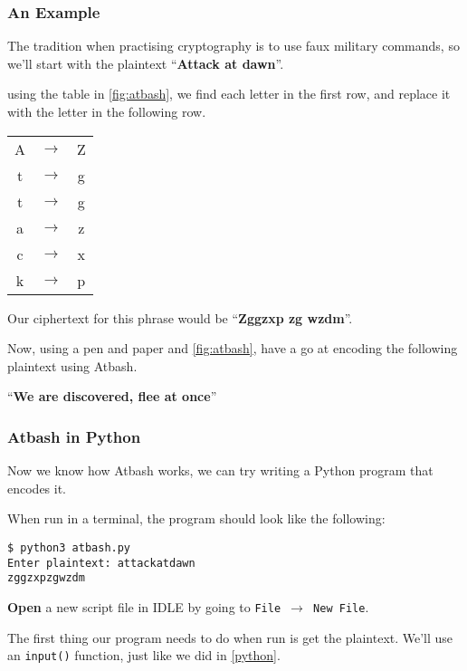 	\subsubsection*{An Example}
	
		The tradition when practising cryptography is to use faux military commands, so we'll start with the plaintext ``\textbf{Attack at dawn}''.
		
		using the table in \autoref{fig:atbash}, we find each letter in the first row, and replace it with the letter in the following row.
		
		\begin{tabular}{ccc}
			A & $\rightarrow$ & Z \\ 
			t & $\rightarrow$ & g \\ 
			t & $\rightarrow$ & g \\ 
			a & $\rightarrow$ & z \\ 
			c & $\rightarrow$ & x \\ 
			k & $\rightarrow$ & p \\ 
		\end{tabular} 
	
		Our ciphertext for this phrase would be ``\textbf{Zggzxp zg wzdm}''.
	
		Now, using a pen and paper and \autoref{fig:atbash}, have a go at encoding the following plaintext using Atbash.
		
		``\textbf{We are discovered, flee at once}''
	
	\subsubsection*{Atbash in Python}
	
		Now we know how Atbash works, we can try writing a Python program that encodes it.
		
		When run in a terminal, the program should look like the following:
		
		\begin{lstlisting}[style=Terminal, numbers=none]
$ python3 atbash.py
Enter plaintext: attackatdawn
zggzxpzgwzdm
		\end{lstlisting}
		
		\textbf{Open} a new script file in IDLE by going to \texttt{File $\rightarrow$ New File}.
		
		The first thing our program needs to do when run is get the plaintext. We'll use an \texttt{input()} function, just like we did in \autoref{python}.
		
		
		
